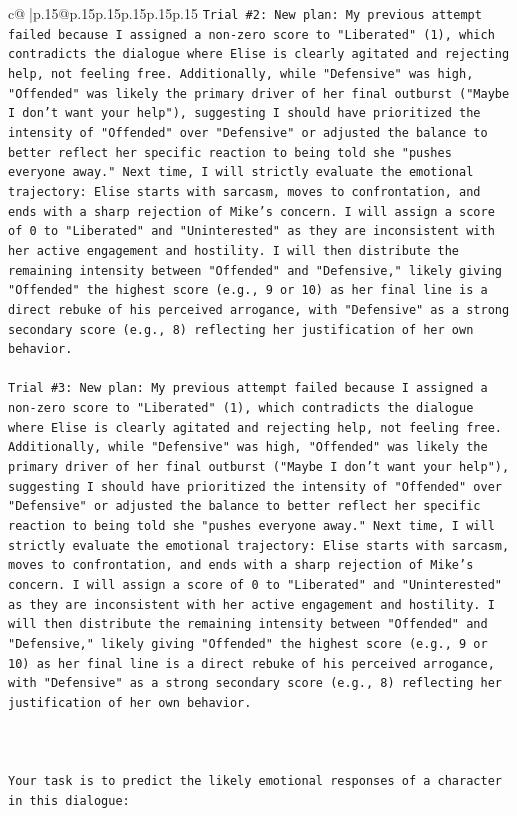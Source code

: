 \documentclass{article}
\begin{document}
{\begin{supertabular}{c@{$\;$}|p{.15\linewidth}@{}p{.15\linewidth}p{.15\linewidth}p{.15\linewidth}p{.15\linewidth}p{.15\linewidth}}
{{{\texttt{Trial \#2: New plan: My previous attempt failed because I assigned a non{-}zero score to "Liberated" (1), which contradicts the dialogue where Elise is clearly agitated and rejecting help, not feeling free. Additionally, while "Defensive" was high, "Offended" was likely the primary driver of her final outburst ("Maybe I don't want your help"), suggesting I should have prioritized the intensity of "Offended" over "Defensive" or adjusted the balance to better reflect her specific reaction to being told she "pushes everyone away." Next time, I will strictly evaluate the emotional trajectory: Elise starts with sarcasm, moves to confrontation, and ends with a sharp rejection of Mike's concern. I will assign a score of 0 to "Liberated" and "Uninterested" as they are inconsistent with her active engagement and hostility. I will then distribute the remaining intensity between "Offended" and "Defensive," likely giving "Offended" the highest score (e.g., 9 or 10) as her final line is a direct rebuke of his perceived arrogance, with "Defensive" as a strong secondary score (e.g., 8) reflecting her justification of her own behavior.} \\
\\ 
\texttt{Trial \#3: New plan: My previous attempt failed because I assigned a non{-}zero score to "Liberated" (1), which contradicts the dialogue where Elise is clearly agitated and rejecting help, not feeling free. Additionally, while "Defensive" was high, "Offended" was likely the primary driver of her final outburst ("Maybe I don't want your help"), suggesting I should have prioritized the intensity of "Offended" over "Defensive" or adjusted the balance to better reflect her specific reaction to being told she "pushes everyone away." Next time, I will strictly evaluate the emotional trajectory: Elise starts with sarcasm, moves to confrontation, and ends with a sharp rejection of Mike's concern. I will assign a score of 0 to "Liberated" and "Uninterested" as they are inconsistent with her active engagement and hostility. I will then distribute the remaining intensity between "Offended" and "Defensive," likely giving "Offended" the highest score (e.g., 9 or 10) as her final line is a direct rebuke of his perceived arrogance, with "Defensive" as a strong secondary score (e.g., 8) reflecting her justification of her own behavior.} \\
\\ 
\\ 
\\ 
\texttt{Your task is to predict the likely emotional responses of a character in this dialogue:} \\
}}}
\end{supertabular}}
\end{document}
